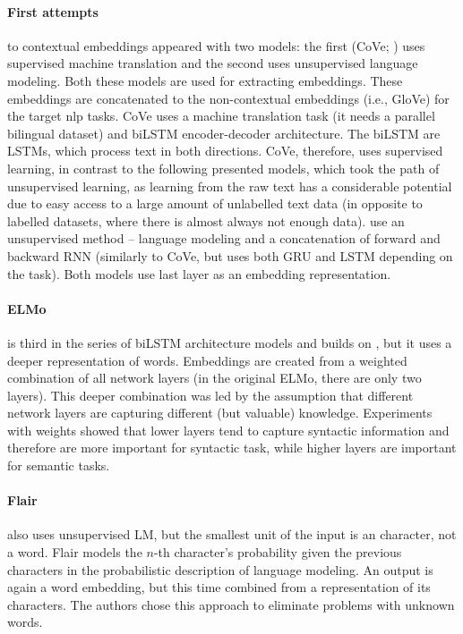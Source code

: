 \paragraph{First attempts} to contextual embeddings appeared with two models: the first (CoVe; \citep{McCann2017}) uses supervised machine translation and the second \citep{Peters2017} uses unsupervised language modeling. Both these models are used for extracting embeddings. These embeddings are concatenated to the non-contextual embeddings (i.e., GloVe) for the target \acrshort{nlp} tasks. CoVe uses a machine translation task (it needs a parallel bilingual dataset) and biLSTM encoder-decoder architecture.  The biLSTM are LSTMs, which  process text in both directions.
CoVe, therefore, uses supervised learning, in contrast to the following presented models, which took the path of unsupervised learning, as learning from the raw text has a considerable potential due to easy access to a large amount of unlabelled text data (in opposite to labelled datasets, where there is almost always not enough data).
\citet{Peters2017} use an unsupervised method -- language modeling and a concatenation of forward and backward RNN (similarly to CoVe, but uses both GRU and LSTM depending on the task). Both models use last layer as an embedding representation. 
\paragraph{ELMo} is third in the series of biLSTM architecture models and builds on \citet{Peters2017}, but it uses a deeper representation of words. Embeddings are created from a weighted combination of all network layers (in the original ELMo, there are only two layers). This deeper combination was led by the assumption that different network layers are capturing different (but valuable) knowledge. Experiments with weights showed that lower layers tend to capture syntactic information and therefore are more important for syntactic task, while higher layers are important for semantic tasks. 
\paragraph{Flair} also uses unsupervised LM, but the smallest unit of the input is an character, not a word. Flair models the $n$-th character's probability given the previous characters in the probabilistic description of language modeling. An output is again a word embedding, but this time combined from a representation of its characters. The authors chose this approach to eliminate problems with unknown words.
